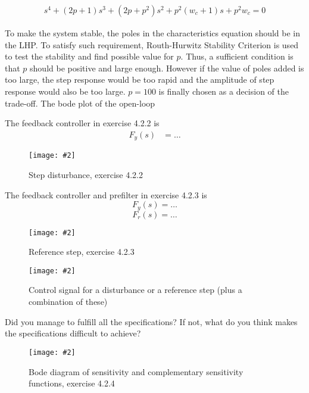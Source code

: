 \documentclass[11pt,a4paper]{article}
\newcommand{\image}[3]{
	\begin{figure}[!ht]
		\centering
	    \texttt{[image: \#2]}
		\caption{#3}
		\label{fig:#2}
	\end{figure}
}
\begin{document}
\begin{enumerate}
	\begin{align*}
		s^{4} + (2p+1)s^{3} + (2p+p^{2})s^{2} + p^{2}(w_{c}+1)s + p^{2}w_{c} = 0
	\end{align*}
	\par To make the system stable, the poles in the characteristics equation should be in the LHP. To satisfy such requirement, Routh-Hurwitz Stability Criterion is used to test the stability and find possible value for $p$. Thus, a sufficient condition is that $p$ should be positive and large enough. However if the value of poles added is too large, the step response would be too rapid and the amplitude of step response would also be too large. $p=100$ is finally chosen as a decision of the trade-off. The bode plot of the open-loop
\end{enumerate}

\par The feedback controller in exercise 4.2.2 is
\begin{align*}
	F_{y}(s) &= \ldots
\end{align*}

	\image{0.5}{system}{Step disturbance, exercise 4.2.2}
	
	The feedback controller and prefilter in exercise 4.2.3 is 
	\[
	F_y(s) = \ldots
	\]
	\[
	F_r(s) = \ldots
	\]
	\image{0.25}{system}{Reference step, exercise 4.2.3}
	\image{0.25}{system}{Control signal for a disturbance or a reference step (plus a combination of these)}

	Did you manage to fulfill all the specifications? If not, what do you think makes the specifications difficult to achieve?
	\par\dotfill\par\dotfill\par
	
	\image{0.25}{system}{Bode diagram of sensitivity and complementary sensitivity functions, exercise 4.2.4}
\end{document}

